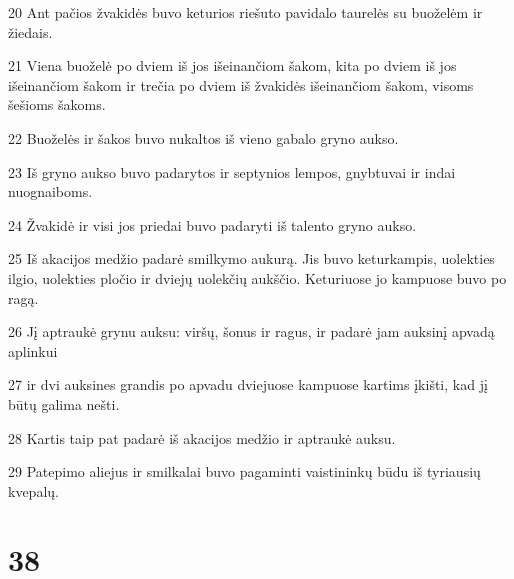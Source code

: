 \par 20 Ant pačios žvakidės buvo keturios riešuto pavidalo taurelės su buoželėm ir žiedais. 
\par 21 Viena buoželė po dviem iš jos išeinančiom šakom, kita po dviem iš jos išeinančiom šakom ir trečia po dviem iš žvakidės išeinančiom šakom, visoms šešioms šakoms. 
\par 22 Buoželės ir šakos buvo nukaltos iš vieno gabalo gryno aukso. 
\par 23 Iš gryno aukso buvo padarytos ir septynios lempos, gnybtuvai ir indai nuognaiboms. 
\par 24 Žvakidė ir visi jos priedai buvo padaryti iš talento gryno aukso. 
\par 25 Iš akacijos medžio padarė smilkymo aukurą. Jis buvo keturkampis, uolekties ilgio, uolekties pločio ir dviejų uolekčių aukščio. Keturiuose jo kampuose buvo po ragą. 
\par 26 Jį aptraukė grynu auksu: viršų, šonus ir ragus, ir padarė jam auksinį apvadą aplinkui 
\par 27 ir dvi auksines grandis po apvadu dviejuose kampuose kartims įkišti, kad jį būtų galima nešti. 
\par 28 Kartis taip pat padarė iš akacijos medžio ir aptraukė auksu. 
\par 29 Patepimo aliejus ir smilkalai buvo pagaminti vaistininkų būdu iš tyriausių kvepalų.



\chapter{38}



